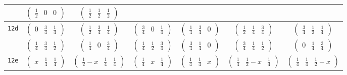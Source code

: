 \documentclass[fleqn,9pt,landscape]{jsarticle}
\begin{document}
\begin{center}
\begin{longtable}{ccccccc}
& $ \begin{pmatrix} \frac{1}{2} & 0 & 0 \end{pmatrix} $ & $ \begin{pmatrix} \frac{1}{2} & \frac{1}{2} & \frac{1}{2} \end{pmatrix} $ & $  $ & $  $ & $  $ & $  $ \\ \hline
{\tt 12d} & $ \begin{pmatrix} 0 & \frac{3}{4} & \frac{1}{4} \end{pmatrix} $ & $ \begin{pmatrix} \frac{1}{2} & \frac{3}{4} & \frac{1}{4} \end{pmatrix} $ & $ \begin{pmatrix} \frac{3}{4} & 0 & \frac{1}{4} \end{pmatrix} $ & $ \begin{pmatrix} \frac{1}{4} & \frac{3}{4} & 0 \end{pmatrix} $ & $ \begin{pmatrix} \frac{1}{2} & \frac{1}{4} & \frac{3}{4} \end{pmatrix} $ & $ \begin{pmatrix} \frac{3}{4} & \frac{1}{2} & \frac{1}{4} \end{pmatrix} $ \\
& $ \begin{pmatrix} \frac{1}{4} & \frac{3}{4} & \frac{1}{2} \end{pmatrix} $ & $ \begin{pmatrix} \frac{1}{4} & 0 & \frac{3}{4} \end{pmatrix} $ & $ \begin{pmatrix} \frac{1}{4} & \frac{1}{2} & \frac{3}{4} \end{pmatrix} $ & $ \begin{pmatrix} \frac{3}{4} & \frac{1}{4} & 0 \end{pmatrix} $ & $ \begin{pmatrix} \frac{3}{4} & \frac{1}{4} & \frac{1}{2} \end{pmatrix} $ & $ \begin{pmatrix} 0 & \frac{1}{4} & \frac{3}{4} \end{pmatrix} $ \\ \hline
{\tt 12e} & $ \begin{pmatrix} x & \frac{1}{4} & \frac{1}{4} \end{pmatrix} $ & $ \begin{pmatrix} \frac{1}{2} - x & \frac{1}{4} & \frac{1}{4} \end{pmatrix} $ & $ \begin{pmatrix} \frac{1}{4} & x & \frac{1}{4} \end{pmatrix} $ & $ \begin{pmatrix} \frac{1}{4} & \frac{1}{4} & x \end{pmatrix} $ & $ \begin{pmatrix} \frac{1}{4} & \frac{1}{2} - x & \frac{1}{4} \end{pmatrix} $ & $ \begin{pmatrix} \frac{1}{4} & \frac{1}{4} & \frac{1}{2} - x \end{pmatrix} $ \\

\end{longtable}
\end{center}
\end{document}
